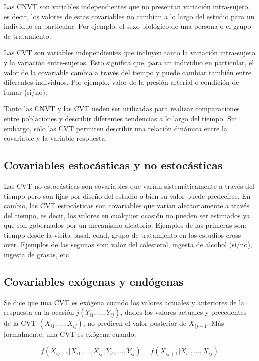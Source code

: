 \documentclass[spanish]{article}
\numberwithin{figure}{subsection}
\numberwithin{equation}{subsection}
\numberwithin{table}{subsection}
\begin{document}
Las CNVT son variables independientes que no presentan variación intra-sujeto, es decir, los valores de estas covariables
no cambian a lo largo del estudio para un individuo en particular. Por ejemplo, el sexo biológico de una persona o el
grupo de tratamiento.

Las CVT son variables independientes que incluyen tanto la variación intra-sujeto y la variación entre-sujetos. Esto
significa que, para un individuo en particular, el valor de la covariable cambia a través del tiempo y puede cambiar
también entre diferentes individuos. Por ejemplo, valor de la presión arterial o condición de fumar (si/no).

Tanto las CNVT y las CVT ueden ser utilizadas para realizar comparaciones entre poblaciones y describir diferentes
tendencias a lo largo del tiempo. Sin embargo, sólo las CVT permiten describir una relación dinámica entre la covariable
y la variable respuesta.

\subsection{Covariables estocásticas y no estocásticas}

Las CVT no estocásticas son covariables que varían sistemáticamente a través del tiempo pero son fijas por diseño del
estudio o bien su valor puede predecirse. En cambio, las CVT estocásticas son covariables que varían aleatoriamente a
través del tiempo, es decir, los valores en cualquier ocasión no pueden ser estimados ya que son gobernados por un
mecanismo aleatorio. Ejemplos de las primeras son: tiempo desde la visita basal, edad, grupo de tratamiento en los
estudios cross-over. Ejemplos de las segunas son: valor del colesterol, ingesta de alcohol (si/no), ingesta de grasas, etc.

\subsection{Covariables exógenas y endógenas}

Se dice que una CVT es exógena cuando los valores actuales y anteriores de la respuesta en la ocasión
$j (Y_{i1}, ..., Y_{ij})$, dados los valores actuales y precedentes de la CVT $(X_{i1}, ..., X_{ij})$, no predicen el
valor posterior de $X_{ij+1}$. Más formalmente, una CVT es exógena cuando:

\begin{equation}
	\label{exogeneidad}
	f(X_{ij+1}|X_{i1}, ..., X_{ij}, Y_{i1}, ..., Y_{ij}) = f(X_{ij+1}|X_{i1}, ..., X_{ij})
\end{equation}
\end{document}
